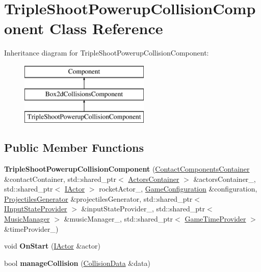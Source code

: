 \hypertarget{classTripleShootPowerupCollisionComponent}{}\section{Triple\+Shoot\+Powerup\+Collision\+Component Class Reference}
\label{classTripleShootPowerupCollisionComponent}
Inheritance diagram for Triple\+Shoot\+Powerup\+Collision\+Component\+:\begin{figure}[H]
\begin{center}
\leavevmode
\includegraphics[height=3.000000cm]{classTripleShootPowerupCollisionComponent}
\end{center}
\end{figure}
\subsection*{Public Member Functions}
\begin{DoxyCompactItemize}
\item 
{\bfseries Triple\+Shoot\+Powerup\+Collision\+Component} (\hyperlink{classContactComponentsContainer}{Contact\+Components\+Container} \&contact\+Container, std\+::shared\+\_\+ptr$<$ \hyperlink{classActorsContainer}{Actors\+Container} $>$ \&actors\+Container\+\_\+, std\+::shared\+\_\+ptr$<$ \hyperlink{classIActor}{I\+Actor} $>$ rocket\+Actor\+\_\+, \hyperlink{classGameConfiguration}{Game\+Configuration} \&configuration, \hyperlink{classProjectilesGenerator}{Projectiles\+Generator} \&projectiles\+Generator, std\+::shared\+\_\+ptr$<$ \hyperlink{classIInputStateProvider}{I\+Input\+State\+Provider} $>$ \&input\+State\+Provider\+\_\+, std\+::shared\+\_\+ptr$<$ \hyperlink{classMusicManager}{Music\+Manager} $>$ \&music\+Manager\+\_\+, std\+::shared\+\_\+ptr$<$ \hyperlink{classGameTimeProvider}{Game\+Time\+Provider} $>$ \&time\+Provider\+\_\+)\hypertarget{classTripleShootPowerupCollisionComponent_ab6de958ce5317a255c700ee01d09f0e9}{}\label{classTripleShootPowerupCollisionComponent_ab6de958ce5317a255c700ee01d09f0e9}

\item 
void {\bfseries On\+Start} (\hyperlink{classIActor}{I\+Actor} \&actor)\hypertarget{classTripleShootPowerupCollisionComponent_a776c5674dcf65558e3cbe9c2aaedee60}{}\label{classTripleShootPowerupCollisionComponent_a776c5674dcf65558e3cbe9c2aaedee60}

\item 
bool {\bfseries manage\+Collision} (\hyperlink{structCollisionData}{Collision\+Data} \&data)\hypertarget{classTripleShootPowerupCollisionComponent_af7e37d723b9e6cc6965b6e46b2c50f2d}{}\label{classTripleShootPowerupCollisionComponent_af7e37d723b9e6cc6965b6e46b2c50f2d}

\end{DoxyCompactItemize}
